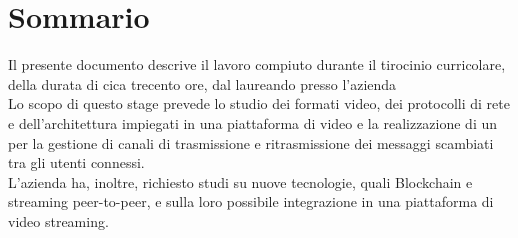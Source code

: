 \chapter*{Sommario}
Il presente documento descrive il lavoro compiuto durante il tirocinio curricolare, della durata di cica trecento ore, dal laureando \myName{} presso l'azienda \nomeAziendaComm{}
\\
Lo scopo di questo stage prevede lo studio dei formati video, dei protocolli di rete e dell'architettura impiegati in una piattaforma di video  e la realizzazione di un  per la gestione di canali di trasmissione e ritrasmissione dei messaggi scambiati tra gli utenti connessi.
\\
L'azienda ha, inoltre, richiesto studi su nuove tecnologie, quali Blockchain e streaming peer-to-peer, e sulla loro possibile integrazione in una piattaforma di video streaming.